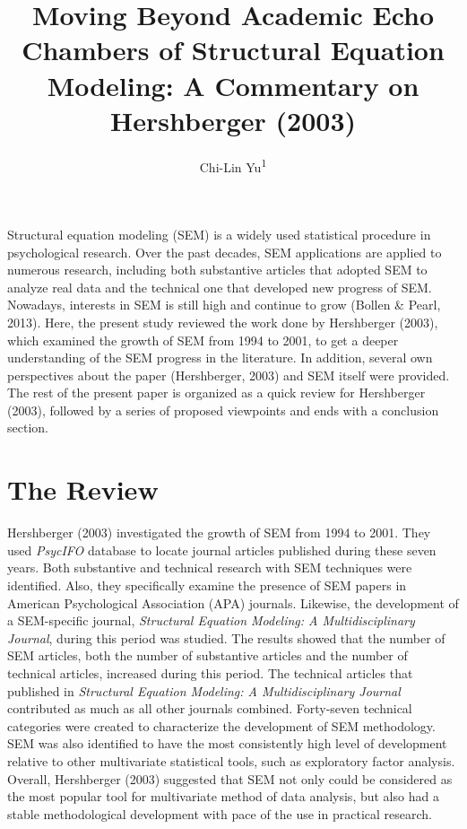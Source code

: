 \documentclass[jou]{apa6}
\title{Moving Beyond Academic Echo Chambers of Structural Equation Modeling: A
Commentary on Hershberger (2003)}
\author{Chi-Lin Yu\textsuperscript{1}}
\affiliation{
    \vspace{0.5cm}
          \textsuperscript{1} Department of Psychology, National Taiwan University  }
\theoremstyle{definition}
\theoremstyle{definition}
\theoremstyle{definition}
\theoremstyle{remark}
\begin{document}
\maketitle

\setcounter{secnumdepth}{0}



Structural equation modeling (SEM) is a widely used statistical
procedure in psychological research. Over the past decades, SEM
applications are applied to numerous research, including both
substantive articles that adopted SEM to analyze real data and the
technical one that developed new progress of SEM. Nowadays, interests in
SEM is still high and continue to grow (Bollen \& Pearl, 2013). Here,
the present study reviewed the work done by Hershberger (2003), which
examined the growth of SEM from 1994 to 2001, to get a deeper
understanding of the SEM progress in the literature. In addition,
several own perspectives about the paper (Hershberger, 2003) and SEM
itself were provided. The rest of the present paper is organized as a
quick review for Hershberger (2003), followed by a series of proposed
viewpoints and ends with a conclusion section.

\hypertarget{the-review}{%
\section{The Review}\label{the-review}}

Hershberger (2003) investigated the growth of SEM from 1994 to 2001.
They used \emph{PsycIFO} database to locate journal articles published
during these seven years. Both substantive and technical research with
SEM techniques were identified. Also, they specifically examine the
presence of SEM papers in American Psychological Association (APA)
journals. Likewise, the development of a SEM-specific journal,
\emph{Structural Equation Modeling: A Multidisciplinary Journal}, during
this period was studied. The results showed that the number of SEM
articles, both the number of substantive articles and the number of
technical articles, increased during this period. The technical articles
that published in \emph{Structural Equation Modeling: A
Multidisciplinary Journal} contributed as much as all other journals
combined. Forty-seven technical categories were created to characterize
the development of SEM methodology. SEM was also identified to have the
most consistently high level of development relative to other
multivariate statistical tools, such as exploratory factor analysis.
Overall, Hershberger (2003) suggested that SEM not only could be
considered as the most popular tool for multivariate method of data
analysis, but also had a stable methodological development with pace of
the use in practical research.
\end{document}
